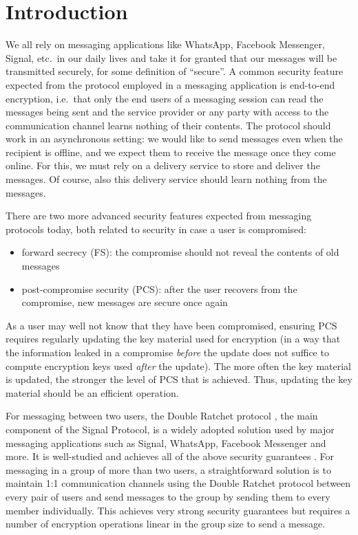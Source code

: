 \section{Introduction}

We all rely on messaging applications like WhatsApp, Facebook Messenger, Signal, etc.\ in our daily lives and take it for granted that our messages will be transmitted securely, for some definition of ``secure''. A common security feature expected from the protocol employed in a messaging application is end-to-end encryption, i.e.\ that only the end users of a messaging session can read the messages being sent and the service provider or any party with access to the communication channel learns nothing of their contents. The protocol should work in an asynchronous setting: we would like to send messages even when the recipient is offline, and we expect them to receive the message once they come online. For this, we must rely on a delivery service to store and deliver the messages. Of course, also this delivery service should learn nothing from the messages.

There are two more advanced security features expected from messaging protocols today, both related to security in case a user is compromised:
\begin{itemize}
	\item forward secrecy (FS): the compromise should not reveal the contents of old messages
	\item post-compromise security (PCS): after the user recovers from the compromise, new messages are secure once again
\end{itemize}
As a user may well not know that they have been compromised, ensuring PCS requires regularly updating the key material used for encryption (in a way that the information leaked in a compromise \emph{before} the update does not suffice to compute encryption keys used \emph{after} the update). The more often the key material is updated, the stronger the level of PCS that is achieved. Thus, updating the key material should be an efficient operation.

For messaging between two users, the Double Ratchet protocol \cite{double-ratchet}, the main component of the Signal Protocol, is a widely adopted solution used by major messaging applications such as Signal, WhatsApp, Facebook Messenger and more. It is well-studied and achieves all of the above security guarantees \cite{double-ratchet-analysis}. For messaging in a group of more than two users, a straightforward solution is to maintain 1:1 communication channels using the Double Ratchet protocol between every pair of users and send messages to the group by sending them to every member individually. This achieves very strong security guarantees but requires a number of encryption operations linear in the group size to send a message.


